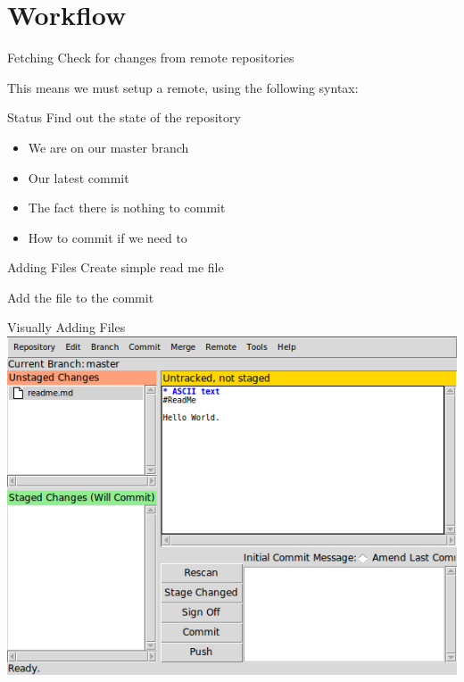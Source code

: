 \documentclass{beamer}
\begin{document}
  \section{Workflow}
  \begin{frame}[fragile=singleslide]{Fetching}
    Check for changes from remote repositories
    
    This means we must setup a remote, using the following syntax:
    
  \end{frame}
  \begin{frame}[fragile=singleslide]{Status}
    Find out the state of the repository
    
    \begin{itemize}
      \item We are on our master branch
      \item Our latest commit
      \item The fact there is nothing to commit
      \item How to commit if we need to
    \end{itemize}
  \end{frame}
  \begin{frame}[fragile=singleslide]{Adding Files}
    Create simple read me file
    
    
  \end{frame}
  \begin{frame}[fragile=singleslide]
    Add the file to the commit
    
    
  \end{frame}
  \begin{frame}{Visually Adding Files}
    \centering
    \includegraphics[scale=0.4,keepaspectratio]{git-gui.png}
  \end{frame}
\end{document}
